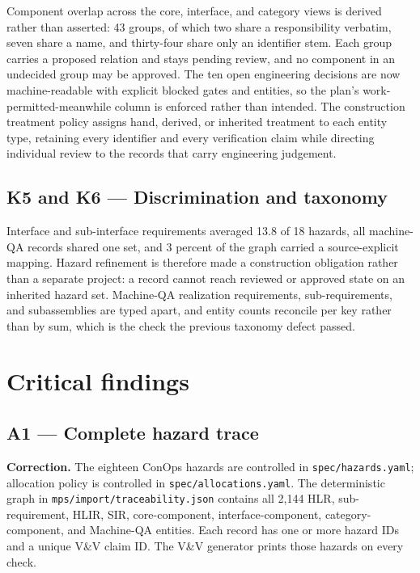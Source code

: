 \documentclass[11pt,letterpaper]{article}
\begin{document}
Component overlap across the core, interface, and category views is derived rather than
asserted: 43 groups, of which two share a responsibility verbatim, seven share a name, and
thirty-four share only an identifier stem. Each group carries a proposed relation and stays
pending review, and no component in an undecided group may be approved. The ten open
engineering decisions are now machine-readable with explicit blocked gates and entities, so
the plan's work-permitted-meanwhile column is enforced rather than intended. The
construction treatment policy assigns hand, derived, or inherited treatment to each entity
type, retaining every identifier and every verification claim while directing individual
review to the records that carry engineering judgement.

\subsection{K5 and K6 --- Discrimination and taxonomy}

Interface and sub-interface requirements averaged 13.8 of 18 hazards, all machine-QA records
shared one set, and 3 percent of the graph carried a source-explicit mapping. Hazard
refinement is therefore made a construction obligation rather than a separate project: a
record cannot reach reviewed or approved state on an inherited hazard set. Machine-QA
realization requirements, sub-requirements, and subassemblies are typed apart, and entity
counts reconcile per key rather than by sum, which is the check the previous taxonomy
defect passed.

\section{Critical findings}

\subsection{A1 --- Complete hazard trace}

\textbf{Correction.} The eighteen ConOps hazards are controlled in \nolinkurl{spec/hazards.yaml}; allocation policy is controlled in \nolinkurl{spec/allocations.yaml}. The deterministic graph in \nolinkurl{mps/import/traceability.json} contains all 2,144 HLR, sub-requirement, HLIR, SIR, core-component, interface-component, category-component, and Machine-QA entities. Each record has one or more hazard IDs and a unique V\&V claim ID. The V\&V generator prints those hazards on every check.
\end{document}

